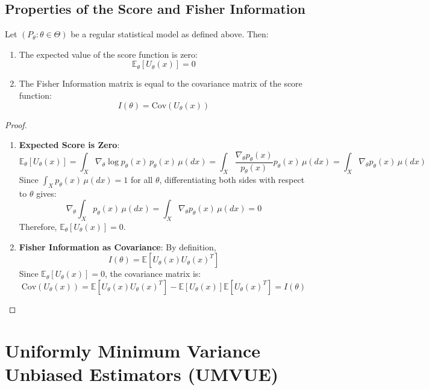 \documentclass[open=any, 11pt,paper=A4]{scrreprt}
\begin{document}
\subsection{Properties of the Score and Fisher Information}

\begin{lemma}
Let $(P_\theta : \theta \in \Theta)$ be a regular statistical model as defined above. Then:
\begin{enumerate}
    \item The expected value of the score function is zero:
    \[
    \mathbb{E}_\theta \left[ U_\theta(x) \right] = 0
    \]
    
    \item The Fisher Information matrix is equal to the covariance matrix of the score function:
    \[
    I(\theta) = \text{Cov}\left( U_\theta(x) \right)
    \]
\end{enumerate}
\end{lemma}

\begin{proof}
\begin{enumerate}
    \item \textbf{Expected Score is Zero}: 
    \[
    \mathbb{E}_\theta \left[ U_\theta(x) \right] = \int_X \nabla_\theta \log p_\theta(x) \, p_\theta(x) \, \mu(dx) = \int_X \frac{\nabla_\theta p_\theta(x)}{p_\theta(x)} p_\theta(x) \, \mu(dx) = \int_X \nabla_\theta p_\theta(x) \, \mu(dx)
    \]
    Since $\int_X p_\theta(x) \, \mu(dx) = 1$ for all $\theta$, differentiating both sides with respect to $\theta$ gives:
    \[
    \nabla_\theta \int_X p_\theta(x) \, \mu(dx) = \int_X \nabla_\theta p_\theta(x) \, \mu(dx) = 0
    \]
    Therefore, $\mathbb{E}_\theta \left[ U_\theta(x) \right] = 0$.
    
    \item \textbf{Fisher Information as Covariance}: 
    By definition,
    \[
    I(\theta) = \mathbb{E}\left[ U_\theta(x) U_\theta(x)^T \right]
    \]
    Since $\mathbb{E}_\theta \left[ U_\theta(x) \right] = 0$, the covariance matrix is:
    \[
    \text{Cov}\left( U_\theta(x) \right) = \mathbb{E}\left[ U_\theta(x) U_\theta(x)^T \right] - \mathbb{E}\left[ U_\theta(x) \right] \mathbb{E}\left[ U_\theta(x)^T \right] = I(\theta)
    \]
\end{enumerate}
\end{proof}

\section{Uniformly Minimum Variance Unbiased Estimators (UMVUE)}
\end{document}
